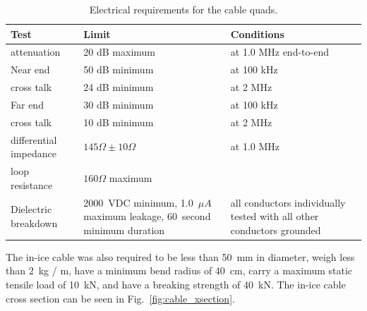 \begin{table}[h]
  \centering
  \begin{tabularx}{\textwidth}{| l | X | X | }
    \hline
    \bf{Test} & \bf{Limit} & \bf{Conditions} \\
    \hline

    attenuation & 20 dB maximum & at 1.0 MHz end-to-end \\
    \hline
%

   Near end & 50 dB minimum & at 100 kHz \\
    \cline {2-3}
    \cline {2-3}
   cross talk & 24 dB minimum & at 2 MHz \\
    \hline

    Far end & 30 dB minimum & at 100 kHz\\
    \cline {2-3}
    \cline {2-3}
    cross talk& 10 dB minimum & at 2 MHz \\
    \hline

    differential impedance & $145\Omega \pm 10\Omega$ & at 1.0 MHz \\
    \hline

    loop resistance & $160\Omega$ maximum & \\
    \hline

    Dielectric breakdown & 2000~VDC minimum, 1.0~$\mu A$ maximum leakage, 60~second
    minimum duration & all conductors individually tested with all other
    conductors grounded \\
    \hline    
  \end{tabularx}
  \caption{Electrical requirements for the cable quads.} 
  \label{tab:quad_requirements}
\end{table}

 The in-ice cable was also required to be less than 50~mm in
 diameter, weigh less than 2~kg / m, have a minimum bend radius of 40~cm,
 carry a maximum static tensile load of 10~kN, and have a breaking strength
 of 40~kN. The in-ice cable cross section can be seen in
 Fig.~\ref{fig:cable_xsection}.  

